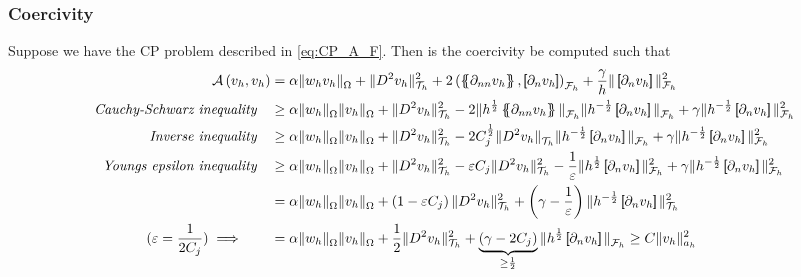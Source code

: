 \subsubsection{Coercivity}%
\label{ssub:coercitivity}


Suppose we have the CP problem described in \eqref{eq:CP_A_F}. Then is the coercivity be computed such that
{\footnotesize
\[
    \begin{split}
\mathcal{A} \left( v_{h}, v_{h} \right) & =\alpha \|  w_{h}  v_{h} \|_{ \Omega  }^{  } +  \| D^2v_{h} \|_{ \mathcal{T} _{h} }^{2  }  + 2 \left(  \mean{ \partial _{nn} v_{h} }    ,  \jump{ \partial _{n}v_{h} }     \right) _{\mathcal{F} _{h}} +  \frac{\gamma}{h} \|  \jump{ \partial _{n} v_{h} }
  \|_{ \mathcal{F} _{h} }^{ 2 } \\
\quad \textit{Cauchy-Schwarz inequality} \quad
& \ge \alpha \| w_{h}  \|_{\Omega   }^{  } \| v_{h} \|_{\Omega   }^{  } +   \| D ^2 v_{h} \|_{ \mathcal{T} _{h} }^{2  } -2 \| h^{\frac{1}{2}} \mean{ \partial _{nn}v_{h} }    \|_{  \mathcal{F} _{h}}^{  } \| h^{-\frac{1}{2}} \jump{ \partial _{n}v_{h} }    \|_{  \mathcal{F} _{h}}^{  } + \gamma \| h^{-\frac{1}{2}}  \jump{ \partial _{n}v_{h} }   \|_{ \mathcal{F} _{h}  }^{ 2 } \\
\quad \textit{Inverse inequality} \quad
 &  \ge \alpha \| w_{h}  \|_{\Omega   }^{  } \| v_{h} \|_{\Omega   }^{  } + \| D ^2 v_{h}  \|_{ \mathcal{T} _{h}  }^{ 2  } - 2 C^{\frac{1}{2}}_{j} \|   D ^2 v_{h}    \|_{ \mathcal{T} _{h}  }^{  } \| h^{-\frac{1}{2}} \jump{ \partial _{n} v_{h} }   \|_{ \mathcal{F} _{h} }^{  }  + \gamma \| h^{ -\frac{1}{2}} \jump{
 \partial _{n } v_{h}}   \|_{ \mathcal{F}_{h}}^{2}  \\
\quad \textit{ Youngs epsilon inequality} \quad
  &  \ge\alpha \| w_{h}  \|_{\Omega   }^{  } \| v_{h} \|_{\Omega   }^{  } +  \| D ^2 v_{h} \|_{ \mathcal{T}_{h}  }^{2  } - \varepsilon C_{j} \| D ^2 v_{h} \|_{ \mathcal{T} _{h} }^{2  } - \frac{1}{\varepsilon } \| h^{\frac{1}{2}} \jump{ \partial _{n} v_{h} }   \|_{ \mathcal{F} _{h} }^{2  }  + \gamma \|
  h^{-\frac{1}{2}} \jump{ \partial _{n} v_{h}}   \|_{ \mathcal{F} _{h} }^{2  }  \\
  & =  \alpha \| w_{h}  \|_{\Omega   }^{  } \| v_{h} \|_{\Omega   }^{  } +\left( 1 - \varepsilon C_{j} \right) \| D ^2 v_{h} \|_{\mathcal{T} _{h}  }^{ 2 } + \left( \gamma  - \frac{1}{\varepsilon } \right) \| h^{-\frac{1}{2}} \jump{ \partial _{n} v_{h} }   \|_{ \mathcal{T} _{h} }^{ 2 } \\
  (\varepsilon  = \frac{1}{2 C_{j} })  \implies  \quad \quad &= \alpha \| w_{h}  \|_{\Omega   }^{  } \| v_{h} \|_{\Omega   }^{  } +\frac{1}{2} \| D ^2 v_{h} \|_{ \mathcal{T} _{h} }^{ 2 }  + \underbrace{\left( \gamma -2 C_{j} \right)}_{ \ge  \frac{1}{2}}  \| h^{\frac{1}{2}} \jump{ \partial _{n} v_{h} }   \|_{
  \mathcal{F} _{h} }^{  } \ge C \| v_{h} \|_{ a_{h} }^{  2}
    \end{split}
\]
}
